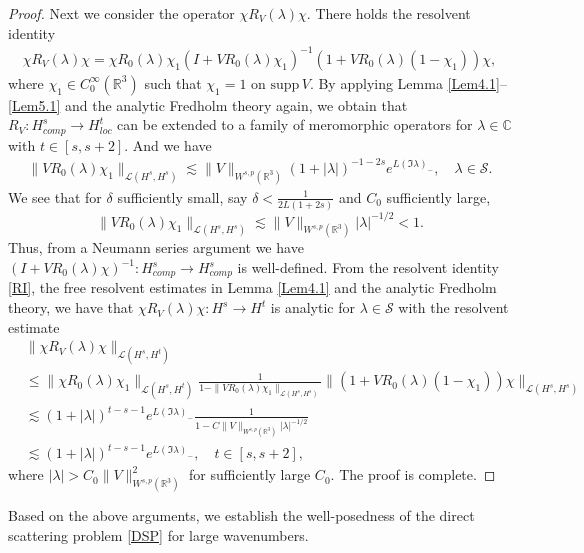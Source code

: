 \documentclass[reqno, 12pt]{amsart}
\numberwithin{equation}{section}
\begin{document}
\begin{proof}
 Next we consider the operator $\chi R_V(\lambda)\chi$. There holds the resolvent identity \begin{align}\label{RI}
     \chi R_{ V}(\lambda)\chi = \chi R_0(\lambda) \chi_1 (I +   VR_0(\lambda) \chi_1)^{-1}(1 + VR_0(\lambda)(1-\chi_1))  \chi,
 \end{align} where $ \chi_1\in C_0^\infty(\mathbb R^3)$ such that $\chi_1 = 1$ on $\text{supp}\,V$. By applying Lemma \ref{Lem4.1}--\ref{Lem5.1} and the analytic Fredholm theory again, we obtain that $R_{V}: H^s_{comp} \to H^t_{loc}$ can be extended to a family of meromorphic operators for $\lambda \in \mathbb C$ with $t \in [s,s+2]$. And we have \begin{align*}
    \| V R_0(\lambda) \chi_1  \|_{\mathcal{L}(H^{s},H^{s})} \lesssim \| V\|_{W^{s,p}(\mathbb R^3)} (1+|\lambda|)^{-1-2s}e^{L (\Im \lambda)_-} ,\quad \lambda\in\mathscr{S}.
\end{align*}
We see that for $\delta$ sufficiently small, say $\delta<\frac{1}{2L(1+2s)}$ and $C_0$ sufficiently large, 
\[
\| V R_0(\lambda)\chi_1\|_{\mathcal{L}(H^{s},H^{s})} \lesssim \| V\|_{W^{s,p}(\mathbb R^3)}|\lambda|^{-1/2}<1.
\]
Thus, from a Neumann series argument we have $(I +  VR_0(\lambda)\chi)^{-1}: H^s_{comp}\to H^s_{comp}$
is well-defined. From the resolvent identity \eqref{RI}, the free resolvent estimates in Lemma \ref{Lem4.1} and the analytic Fredholm theory, we have that $\chi R_{ V}(\lambda) \chi:  H^s\to H^t$ is analytic for $\lambda\in\mathscr S$
with the resolvent estimate
\begin{align*}
     &\|\chi R_{ V}(\lambda) \chi \|_{\mathcal{L}(H^s,H^t)}  \\ &\le \|\chi R_0(\lambda) \chi_1 \|_{\mathcal{L}(H^s,H^t)}\frac{1}{1-\|VR_0(\lambda)\chi_1\|_{\mathcal L(H^s,H^s)}}\|(1 + VR_0(\lambda)(1-\chi_1))\chi\|_{\mathcal L(H^s,H^s)}  \\ &\lesssim (1+|\lambda|)^{t-s-1}e^{L (\Im \lambda)_-} \frac{1}{1-C\|V\|_{W^{s,p}(\mathbb R^3)}|\lambda|^{-1/2}} \\ &\lesssim(1+|\lambda|)^{t-s-1}e^{L (\Im \lambda)_-},\quad t \in [s,s+2],
 \end{align*} where $|\lambda|>C_0\|V\|^2_{W^{s,p}(\mathbb R^3)}$ for sufficiently large $C_0.$
 The proof is complete.
 \end{proof}
 
Based on the above arguments, we establish the well-posedness of the direct scattering problem \eqref{DSP} for large wavenumbers.
 
\end{document}
